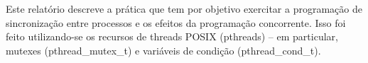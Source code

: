 Este relatório descreve a prática que tem por objetivo exercitar a programação de sincronização entre processos e os efeitos da programação concorrente. Isso foi feito utilizando-se os recursos de threads POSIX (pthreads) -- em particular, mutexes (pthread_mutex_t) e variáveis de condição (pthread_cond_t).